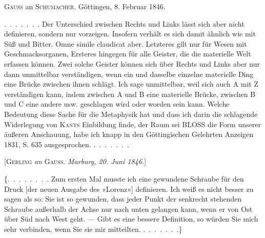 %
\begin{center}
\textsc{Gauss} an \textsc{Schumacher}. Göttingen, 8. Februar 1846.
\end{center}

\mbox{.\ .\ .\ .\ .\ .\ .} Der Unterschied zwischen Rechts und Links lässt sich aber nicht definieren, sondern nur vorzeigen. Insofern verhält es sich damit ähnlich wie mit Süß und Bitter. Omne simile claudicat aber. Letzteres gilt nur für Wesen mit Geschmacksorganen, Ersteres hingegen für alle Geister, die die materielle Welt erfassen können. Zwei solche Geister können sich über Rechts und Links aber nur dann unmittelbar verständigen, wenn ein und dasselbe einzelne materielle Ding eine Brücke zwischen ihnen schlägt. Ich sage unmittelbar, weil sich auch A mit Z verständigen kann, indem zwischen A und B eine materielle Brücke, zwischen B und C eine andere usw. geschlagen wird oder worden sein kann. Welche Bedeutung diese Sache für die Metaphysik hat und dass ich darin die schlagende Widerlegung von \textsc{Kants} Einbildung finde, der Raum sei BLOSS die Form unserer äußeren Anschauung, habe ich knapp in den Göttingischen Gelehrten Anzeigen 1831, S. 635 ausgesprochen. \mbox{.\ .\ .\ .\ .\ .\ .}

\par\bigskip

\begin{center}
[\textsc{Gerling} \emph{an} \textsc{Gauss}. \emph{Marburg, 20. Juni 1846.}]
\end{center}

\{\mbox{.\ .\ .\ .\ .\ .\ .\ .} Zum ersten Mal musste ich eine gewundene Schraube für den Druck [der neuen Ausgabe des »Lorenz«] definieren. Ich weiß es nicht besser zu sagen als so: Sie ist so gewunden, dass jeder Punkt der senkrecht stehenden Schraube außerhalb der Achse nur nach unten gelangen kann, wenn er von Ost über Süd nach West geht. --- Gibt es eine bessere Definition, so würden Sie mich sehr verbinden, wenn Sie sie mir mitteilten. \mbox{.\ .\ .\ .\ .\ .\ .}\}

\par\bigskip
